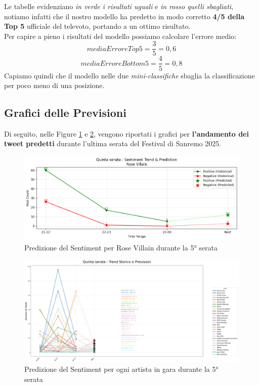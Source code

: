 \documentclass[a4paper,12pt]{article}
\begin{document}
Le tabelle evidenziano \textit{in verde i risultati uguali} e \textit{in rosso quelli sbagliati}, notiamo infatti che il nostro modello ha predetto in modo corretto \textbf{4/5 della Top 5} ufficiale del televoto, portando a un ottimo risultato.\\
Per capire a pieno i risultati del modello possiamo calcolare l'errore medio:
\[mediaErroreTop5=\frac{3}{5}=0,6\]
\[mediaErroreBottom5=\frac{4}{5}=0,8\]
Capiamo quindi che il modello nelle due \textit{mini-classifiche} sbaglia la classificazione per poco meno di una posizione.

\subsection{Grafici delle Previsioni}
Di seguito, nelle Figure \ref{fig:rose_prediction_plot} e \ref{fig:totale_prediction_plot}, vengono riportati i grafici per \textbf{l'andamento dei tweet predetti} durante l'ultima serata del Festival di Sanremo 2025.

\begin{figure}[H]
    \centering
    \includegraphics[width=\linewidth]{media/rose_prediction.png}
    \caption{Predizione del Sentiment per Rose Villain durante la 5° serata}
    \label{fig:rose_prediction_plot}
\end{figure}

\begin{figure}[H]
    \centering
    \includegraphics[width=1.2\linewidth]{media/previsioni_quintaserata.png}
    \caption{Predizione del Sentiment per ogni artista in gara durante la 5° serata}
    \label{fig:totale_prediction_plot}
\end{figure}

\newpage
\printbibliography
\thispagestyle{empty}
\end{document}
